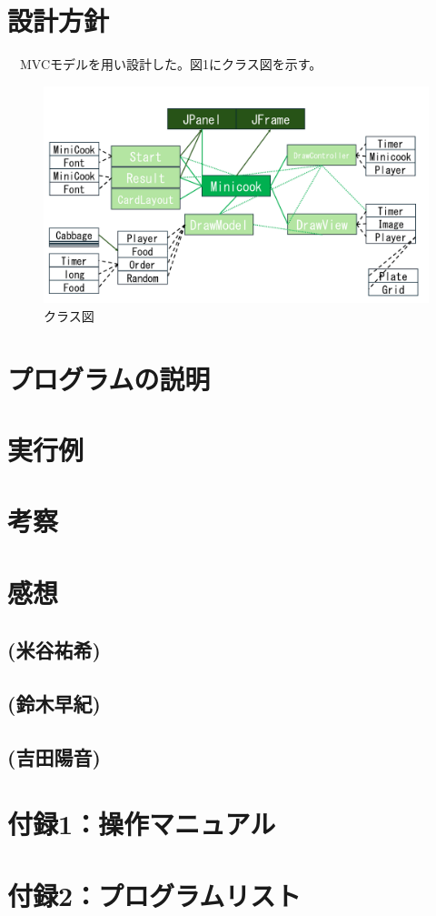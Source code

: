 \documentclass[a4j]{jarticle} %
\begin{document}
\section{設計方針}
　MVCモデルを用い設計した。図1にクラス図を示す。
\begin{figure}[H]
  \begin{center}
  \includegraphics[scale=0.3]{img/class.png}
  \caption{クラス図}
  \end{center}
\end{figure}



\section{プログラムの説明}


\section{実行例}


\section{考察}


\section{感想}
\subsection*{(米谷祐希)}

\subsection*{(鈴木早紀)}

\subsection*{(吉田陽音)}



\newpage
\section*{付録1：操作マニュアル}



\newpage
\section*{付録2：プログラムリスト}
\end{document}
